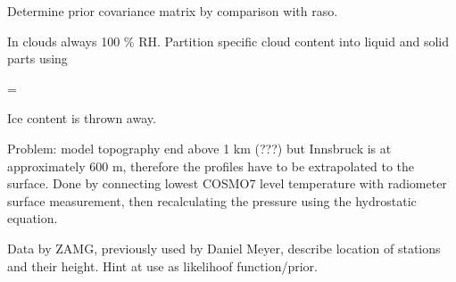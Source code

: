     Determine prior covariance matrix by comparison with raso.

    In clouds always 100 \% RH. Partition specific cloud content into liquid
    and solid parts using

    \startformula
        \QLIQ = \QCLOUD \startcases
              \KELVIN \le \TEMP \NR
            \NC \frac{\TEMP - 233.15 \KELVIN}{40 \KELVIN}
                 \KELVIN \lt \TEMP {} \KELVIN \NR
              \KELVIN \le \TEMP \NR
        \stopcases
    \stopformula

    Ice content is thrown away.

    Problem: model topography end above 1 km (???) but Innsbruck is at
    approximately 600 m, therefore the profiles have to be extrapolated to the
    surface. Done by connecting lowest COSMO7 level temperature with radiometer
    surface measurement, then recalculating the pressure using the hydrostatic
    equation.

\stopsection


\startsection[title={Nordkette Slope Measurements}]

    Data by ZAMG, previously used by Daniel Meyer, describe location of
    stations and their height. Hint at use as likelihoof function/prior.

\stopsection

